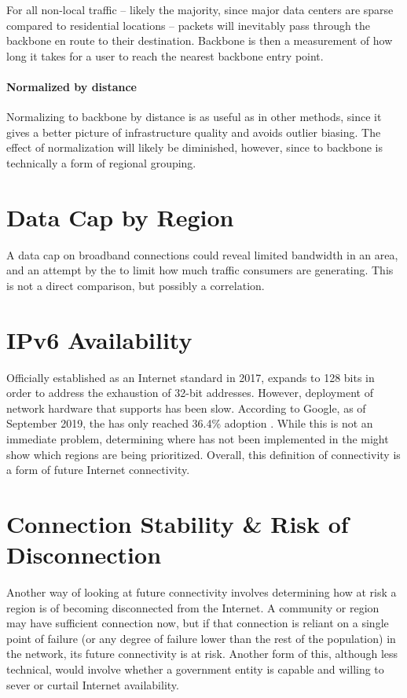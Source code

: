 For all non-local traffic -- likely the majority, since major data centers are sparse compared to residential locations -- packets will inevitably pass through the backbone en route to their destination. Backbone \rtt is then a measurement of how long it takes for a user to reach the nearest backbone entry point.

\paragraph{Normalized by distance}

Normalizing \rtt to backbone by distance is as useful as in other \rtt methods, since it gives a better picture of infrastructure quality and avoids outlier biasing. The effect of normalization will likely be diminished, however, since \rtt to backbone is technically a form of regional grouping.

\section{Data Cap by Region}

A data cap on broadband connections could reveal limited bandwidth in an area, and an attempt by the \isp to limit how much traffic consumers are generating. This is not a direct comparison, but possibly a correlation.

\section{IPv6 Availability}\label{sec:definition_ipv6}

Officially established as an Internet standard in 2017, \ipvs expands \ipvf to 128 bits in order to address the exhaustion of 32-bit \ipvf addresses. However, deployment of network hardware that supports \ipvs has been slow. According to Google, as of September 2019, the \us has only reached 36.4\% \ipvs adoption \cite{Google2019a}. While this is not an immediate problem, determining where \ipvs has not been implemented in the \us might show which regions are being prioritized. Overall, this definition of connectivity is a form of future Internet connectivity.

\section{Connection Stability \& Risk of Disconnection}
Another way of looking at future connectivity involves determining how at risk a region is of becoming disconnected from the Internet. A community or region may have sufficient connection now, but if that connection is reliant on a single point of failure (or any degree of failure lower than the rest of the population) in the network, its future connectivity is at risk. Another form of this, although less technical, would involve whether a government entity is capable and willing to sever or curtail Internet availability.